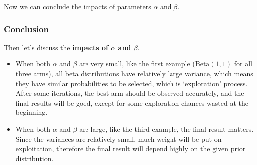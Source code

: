 \documentclass[11pt]{article}
\begin{document}
Now we can conclude the impacts of parameters \(\alpha\) and \(\beta\).
\pagebreak
    \hypertarget{conclusion}{%
\subsubsection{Conclusion}\label{conclusion}}

Then let's discuss the \textbf{impacts of \(\alpha\) and \(\beta\)}.

\begin{itemize}
\item
  When both \(\alpha\) and \(\beta\) are very small, like the first
  example (\(\mathrm{Beta}(1,1)\) for all three arms), all beta
  distributions have relatively large variance, which means they have
  similar probabilities to be selected, which is `exploration' process.
  After some iterations, the best arm should be observed accurately, and
  the final results will be good, except for some exploration chances
  wasted at the beginning.
\item
  When both \(\alpha\) and \(\beta\) are large, like the third example,
  the final result matters. Since the variances are relatively small,
  much weight will be put on exploitation, therefore the final result
  will depend highly on the given prior distribution.


\end{itemize}
\end{document}
